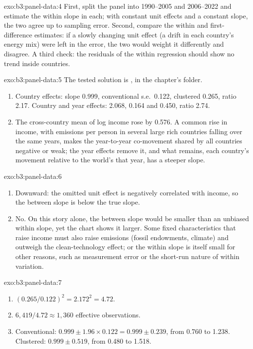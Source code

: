 \begin{solution}{exo:b3:panel-data:4}
First, split the panel into 1990--2005 and 2006--2022 and estimate the within
slope in each; with constant unit effects and a constant slope, the two agree up
to sampling error. Second, compare the within and first-difference estimates: if
a slowly changing unit effect (a drift in each country's energy mix) were left
in the error, the two would weight it differently and disagree. A third check:
the residuals of the within regression should show no trend inside countries.
\end{solution}

\begin{solution}{exo:b3:panel-data:5}
The tested solution is , in the chapter's
 folder.
\begin{enumerate}
\item Country effects: slope 0.999, conventional s.e.\ 0.122, clustered 0.265,
ratio 2.17. Country and year effects: 2.068, 0.164 and 0.450, ratio 2.74.
\item The cross-country mean of log income rose by 0.576. A common rise in
income, with emissions per person in several large rich countries falling over
the same years, makes the year-to-year co-movement shared by all countries
negative or weak; the year effects remove it, and what remains, each country's
movement relative to the world's that year, has a steeper slope.
\end{enumerate}
\end{solution}

\begin{solution}{exo:b3:panel-data:6}
\begin{enumerate}
\item Downward: the omitted unit effect is negatively correlated with income, so
the between slope is below the true slope.
\item No. On this story alone, the between slope would be smaller than an
unbiased within slope, yet the chart shows it larger. Some fixed
characteristics that raise income must also raise emissions (fossil
endowments, climate) and outweigh the clean-technology effect; or the within
slope is itself small for other reasons, such as measurement error or the
short-run nature of within variation.
\end{enumerate}
\end{solution}

\begin{solution}{exo:b3:panel-data:7}
\begin{enumerate}
\item $(0.265/0.122)^2 = 2.172^2 = 4.72$.
\item $6{,}419/4.72 \approx 1{,}360$ effective observations.
\item Conventional: $0.999 \pm 1.96 \times 0.122 = 0.999 \pm 0.239$, from
0.760 to 1.238. Clustered: $0.999 \pm 0.519$, from 0.480 to 1.518.
\end{enumerate}
\end{solution}

